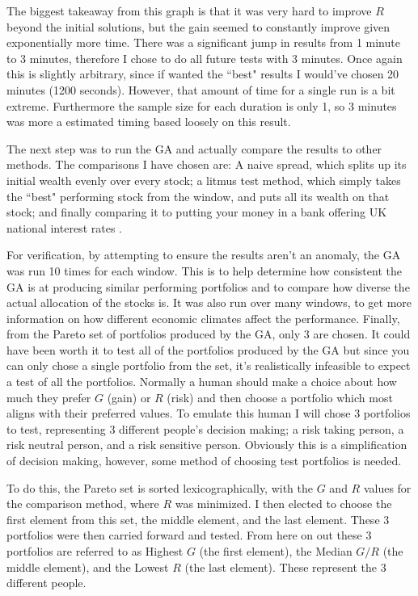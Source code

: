 \documentclass[11pt]{article}
\begin{document}
    The biggest takeaway from this graph is that it was very hard to improve \(R\) beyond
    the initial solutions, but the gain seemed to constantly improve given exponentially
    more time. There was a significant jump in results from 1 minute to 3 minutes,
    therefore I chose to do all future tests with 3 minutes. Once again this is slightly
    arbitrary, since if wanted the ``best" results I would've chosen 20 minutes (1200 seconds).
    However, that amount of time for a single run is a bit extreme. Furthermore the sample size for
    each duration is only 1, so 3 minutes was more a estimated timing based loosely
    on this result.

    The next step was to run the GA and actually compare the results to other methods.
    The comparisons I have chosen are: A naive spread, which splits up its initial wealth
    evenly over every stock; a litmus test method, which simply takes the ``best" performing
    stock from the window, and puts all its wealth on that stock; and finally
    comparing it to putting your money in a bank offering UK national interest rates
    \cite{BankOfE}.

    For verification, by attempting to ensure the results aren't an anomaly, the GA was run 10
    times for each window. This is to help determine how consistent the GA is at producing
    similar performing portfolios and to compare how diverse the actual allocation
    of the stocks is. It was also run over many windows, to get more information
    on how different economic climates affect the performance. Finally, from the Pareto
    set of portfolios produced by the GA, only 3 are chosen. It could have been worth
    it to test all of the portfolios produced by the GA but since you can only
    chose a single portfolio from the set, it's realistically infeasible to expect a
    test of all the portfolios. Normally a human should make a choice about how much
    they prefer \(G\) (gain) or \(R\) (risk) and then choose a portfolio which most
    aligns with their preferred values. To emulate this human I will chose 3
    portfolios to test, representing 3 different people's decision making; a risk
    taking person, a risk neutral person, and a risk sensitive person. Obviously
    this is a simplification of decision making, however, some method of choosing
    test portfolios is needed.

    To do this, the Pareto set is sorted lexicographically, with the \(G\) and \(R\)
    values for the comparison method, where \(R\) was minimized. I then elected to choose
    the first element from this set, the middle element, and the last element.
    These 3 portfolios were then carried forward and tested. From here on out
    these 3 portfolios are referred to as Highest \(G\) (the first element),
    the Median \(G/R\) (the middle element), and the Lowest \(R\) (the last element).
    These represent the 3 different people.
\end{document}
